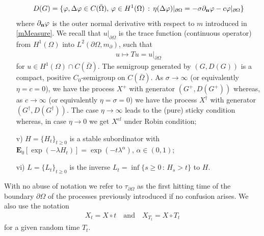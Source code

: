 \documentclass[11pt,a4paper]{article}
\begin{document}
\begin{itemize}
\begin{align*}
D(G) = \{\varphi, \Delta \varphi \in C(\bar{\Omega}), \, \varphi \in H^1(\Omega)\,:\, \eta (\Delta \varphi) |_{\partial \Omega} = - \sigma \partial_{\bf n} \varphi  - c \varphi |_{\partial \Omega}\}
\end{align*}
where $\partial_{\bf n}\varphi$ is the outer normal derivative with respect to $m$ introduced in \eqref{mMeasure}. We recall that $u|_{\partial \Omega}$ is the trace function (continuous operator) from $H^1(\Omega)$ into $L^2(\partial \Omega, m_\partial)$, such that
\begin{align*}
u \mapsto Tu=u|_{\partial \Omega}
\end{align*}
for $u \in H^1(\Omega)\cap C(\bar{\Omega})$. The semigroup generated by $(G, D(G))$ is a compact, positive $C_0$-semigroup on $C(\bar{\Omega})$. As $\sigma \to \infty$ (or equivalently $\eta=c=0$), we have the process $X^+$ with generator $(G^+, D(G^+))$ whereas, as $c\to \infty$ (or equivalently $\eta=\sigma=0$) we have the process $X^\dagger$ with generator $(G^\dagger, D(G^\dagger))$. The case $\eta \to \infty$ leads to the (pure) sticky condition whereas, in case $\eta \to 0$ we get $X^{el}$ under Robin condition;
\item[v)] $H=\{H_t\}_{t\geq 0}$ is a stable subordinator with $\mathbf{E}_0[\exp(-\lambda H_t)] = \exp(-t \lambda^\alpha)$, $\alpha \in (0,1)$;
\item[vi)] $L=\{L_t\}_{t\geq 0}$ is the inverse $L_t= \inf\{s \geq 0\,:\, H_s >t\}$ to $H$.
\end{itemize}
With no abuse of notation we refer to $\tau_{\partial \Omega}$ as the first hitting time of the boundary $\partial \Omega$ of the processes previously introduced if no confusion arises. We also use the notation
\begin{align*}
X_t = X \circ t \quad \textrm{and} \quad X_{T_t} = X \circ T_t
\end{align*} 
for a given random time $T_t$.
\end{document}
